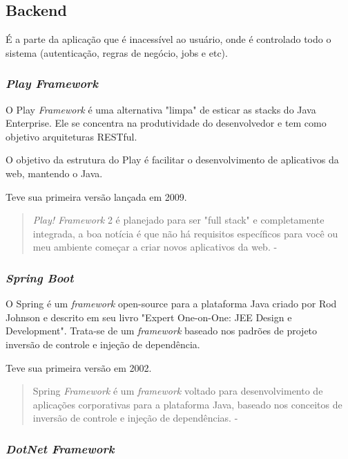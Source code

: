 \subsection{Backend}

É a parte da aplicação que é inacessível ao usuário, onde é controlado todo o sistema (autenticação, regras de negócio, jobs e etc).

\subsubsection{\textit{Play Framework}}

O Play \textit{Framework} é uma alternativa "limpa" de esticar as stacks do Java Enterprise. Ele se concentra na produtividade do desenvolvedor e tem como objetivo arquiteturas RESTful. 

O objetivo da estrutura do Play é facilitar o desenvolvimento de aplicativos da web, mantendo o Java.

Teve sua primeira versão lançada em 2009.

\begin{quote}
\textit{Play! Framework} 2 é planejado para ser "full stack" e completamente integrada, a boa notícia é que não há requisitos específicos para você ou meu ambiente começar a criar novos aplicativos da web. - \cite{petrella2013learning}
\end{quote}

\subsubsection{\textit{Spring Boot}}

O Spring é um \textit{framework} open-source para a plataforma Java criado por Rod Johnson e descrito em seu livro "Expert One-on-One: JEE Design e Development".
Trata-se de um \textit{framework} baseado nos padrões de projeto inversão de controle e injeção de dependência.

Teve sua primeira versão em 2002.

\begin{quote}
  Spring \textit{Framework} é um \textit{framework} voltado para desenvolvimento de aplicações corporativas para a plataforma Java, baseado nos conceitos de inversão de controle e injeção de dependências. - \cite{weissmann2014vire}
\end{quote}

\subsubsection{\textit{DotNet Framework}}

